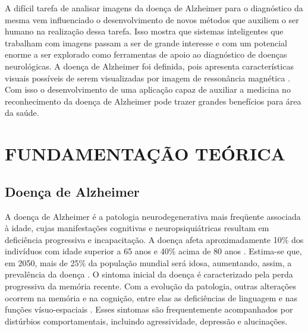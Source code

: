 \documentclass[openright]{UFRGS} %
\begin{document}
A difícil tarefa de analisar imagens da doença de  Alzheimer para o diagnóstico da mesma vem influenciado o desenvolvimento de novos métodos que auxiliem o ser humano na realização dessa tarefa.  Isso mostra que sistemas inteligentes que trabalham com imagens passam a ser de grande interesse e com um potencial enorme a ser explorado como ferramentas de apoio ao diagnóstico de doenças neurológicas.  A doença de  Alzheimer foi definida, pois apresenta características visuais possíveis de serem visualizadas por imagem de ressonância magnética . Com isso o desenvolvimento de uma aplicação  capaz de auxiliar a medicina  no reconhecimento da doença  de Alzheimer  pode trazer grandes benefícios para área da saúde.  

\chapter{FUNDAMENTAÇÃO TEÓRICA} 


\section{Doença de Alzheimer}

A doença de Alzheimer é a patologia neurodegenerativa mais freqüente associada à idade, cujas manifestações cognitivas e neuropsiquiátricas resultam em deficiência progressiva e incapacitação. A doença afeta aproximadamente 10\% dos indivíduos com idade superior a 65 anos e 40\% acima de 80 anos \cite{sereniki2008doencca}. Estima-se que, em 2050, mais de 25\% da população mundial será idosa, aumentando, assim, a prevalência da doença \cite{sereniki2008doencca}. O sintoma inicial da doença é caracterizado pela perda progressiva da memória recente. Com a evolução da patologia, outras alterações ocorrem na memória e na cognição, entre elas as deficiências de linguagem e nas funções vísuo-espaciais \cite{forlenza2005tratamento}. Esses sintomas são frequentemente acompanhados por distúrbios comportamentais, incluindo agressividade, depressão e alucinações. 
\end{document}
